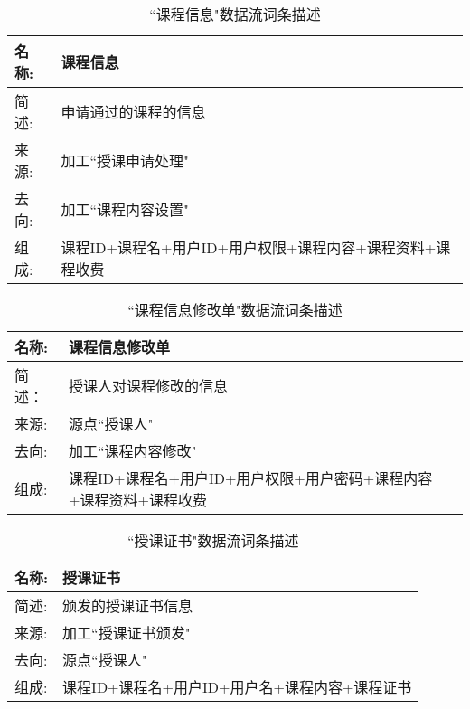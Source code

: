 \begin{table}[H]  
\caption{``课程信息"数据流词条描述}  
\begin{center}  
    \begin{tabular}{l p{11cm}} 
        \hline
        \quad 名称: & 课程信息 \\
        \hline
        \quad 简述: & 申请通过的课程的信息 \\
        \hline
        \quad 来源: & 加工``授课申请处理" \\
        \hline
        \quad 去向: & 加工``课程内容设置" \\
        \hline
        \quad 组成: & 课程ID+课程名+用户ID+用户权限+课程内容+课程资料+课程收费 \\
        \hline
    \end{tabular}
    \label{tab1}
\end{center}
\end{table}



\begin{table}[H]  
\caption{``课程信息修改单"数据流词条描述}  
\begin{center}  
    \begin{tabular}{l p{11cm}} 
        \hline
        \quad 名称: & 课程信息修改单 \\
        \hline
        \quad 简述： & 授课人对课程修改的信息 \\
        \hline
        \quad 来源: & 源点``授课人" \\
        \hline
        \quad 去向: & 加工``课程内容修改" \\
        \hline
        \quad 组成: & 课程ID+课程名+用户ID+用户权限+用户密码+课程内容+课程资料+课程收费 \\
        \hline
    \end{tabular}
    \label{tab1}
\end{center}
\end{table}

\begin{table}[H]  
\caption{``授课证书"数据流词条描述}  
\begin{center}  
    \begin{tabular}{l p{11cm}} 
        \hline
        \quad 名称: & 授课证书 \\
        \hline
        \quad 简述: & 颁发的授课证书信息 \\
        \hline
        \quad 来源: & 加工``授课证书颁发" \\
        \hline
        \quad 去向: & 源点``授课人" \\
        \hline
        \quad 组成: & 课程ID+课程名+用户ID+用户名+课程内容+课程证书 \\
        \hline
    \end{tabular}
    \label{tab1}
\end{center}
\end{table}



